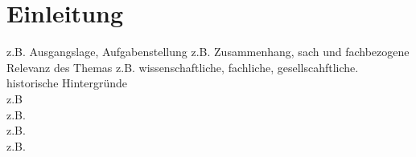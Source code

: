 \section{Einleitung}

z.B.  Ausgangslage, Aufgabenstellung\newline
z.B. Zusammenhang, sach und fachbezogene Relevanz des Themas \newline
z.B. wissenschaftliche, fachliche, gesellscahftliche. historische Hintergründe\\

z.B \\

z.B. \\

z.B. \\

z.B. \\
